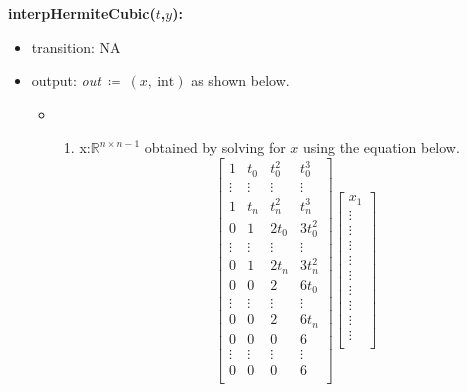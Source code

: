 \documentclass[12pt, titlepage]{article}
\begin{document}
\noindent \textbf{interpHermiteCubic($t$,$y$):}
\begin{itemize}
\item transition: NA
	
\item output: \textit{out}$\ \coloneqq\ (x,\ \text{int})$ as shown below.


	\begin{itemize}
	\item 
	\begin{enumerate}
		\item x:$\mathbb{R}^{n \times n-1}$ obtained by solving for $x$ using 
		the equation below.
		\begin{equation*}
		\begin{bmatrix}
		1          & t_0       & t_0 ^{2}         & t_0 ^{3}         \\
		\vdots     & \vdots    & \vdots           & \vdots            \\
		1          & t_n       & t_n ^{2}         & t_n ^{3}          \\
		0          & 1         & 2 t_0            & 3 t_0 ^{2}         \\
		\vdots     & \vdots    & \vdots           & \vdots            \\
		0          & 1         & 2 t_n            & 3 t_n ^{2}          \\
		0          & 0         & 2                & 6 t_0              \\
		\vdots     & \vdots    & \vdots           & \vdots            \\
		0          & 0         & 2                & 6 t_n           \\
		0          & 0         & 0                & 6                 \\
		\vdots     & \vdots    & \vdots           & \vdots            \\
		0          & 0         & 0                & 6               \\
		\end{bmatrix}
		\begin{bmatrix}
		x_1  \\
		\vdots \\
		\vdots \\
		\vdots \\
		\vdots \\
		\vdots \\
		\vdots \\
		\vdots \\
		\vdots \\
		\vdots \\
		

\end{bmatrix}
\end{equation*}
\end{enumerate}
\end{itemize}
\end{itemize}
\end{document}
